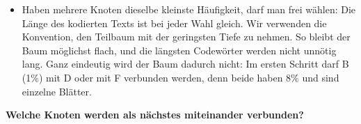 \begin{itemize}
\begin{figure}[H]
		      \caption{Erster Schritt im Huffman-Kodierungs-Algorithmus}
	      \end{figure}
	\item Haben mehrere Knoten dieselbe kleinste Häufigkeit, darf man frei wählen: Die Länge des kodierten Texts ist bei jeder Wahl gleich. Wir verwenden die Konvention, den Teilbaum mit der geringsten Tiefe zu nehmen. So bleibt der Baum möglichst flach, und die längsten Codewörter werden nicht unnötig lang. Ganz eindeutig wird der Baum dadurch nicht: Im ersten Schritt darf B (1\%) mit D oder mit F verbunden werden, denn beide haben 8\% und sind einzelne Blätter.
\end{itemize}
\textbf{Welche Knoten werden als nächstes miteinander verbunden?}

